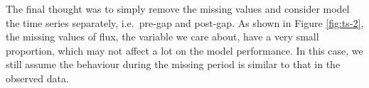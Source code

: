 \documentclass[
]{article}
\begin{document}
The final thought was to simply remove the missing values and consider model the time series separately, i.e.~pre-gap and post-gap. As shown in Figure \ref{fig:ts-2}, the missing values of flux, the variable we care about, have a very small proportion, which may not affect a lot on the model performance. In this case, we still assume the behaviour during the missing period is similar to that in the observed data.
\end{document}
